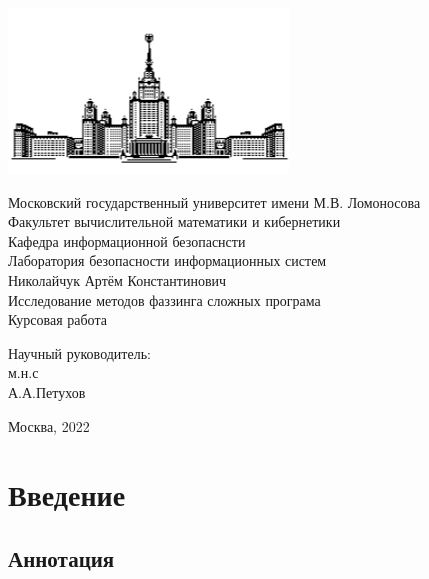 \documentclass[a4paper]{article}
\begin{document}
 
\begin{center}
\includegraphics{MSU}

\hfill \break
\normalsize{Московский государственный университет имени М.В. Ломоносова}\\
\normalsize{Факультет вычислительной математики и кибернетики}\\
\normalsize{Кафедра информационной безопаснсти}\\
\normalsize{Лаборатория безопасности информационных систем}\\
 \hfill \break
\normalsize{Николайчук Артём Константинович}\\
\hfill\break
\hfill \break
\hfill \break
\hfill \break
\large{Исследование методов фаззинга сложных програма}\\
\hfill \break
\hfill \break
\hfill \break
\normalsize{Курсовая работа}\\
\hfill \break
\hfill \break
\hfill \break
\hfill \break
\hfill \break
\hfill \break
\hfill \break
\hfill \break
\begin{flushright}
    \normalsize{Научный руководитель:}\\
    \normalsize{м.н.с}\\
    \normalsize{А.А.Петухов}\\
\end{flushright}
\end{center}
\vspace*{\fill}
\begin{center} Москва, 2022 \end{center}
\thispagestyle{empty}
 
\newpage
     
    \tableofcontents
\newpage
 
\newpage
\section{Введение}

\subsection{Аннотация}
\indent
\end{document}
